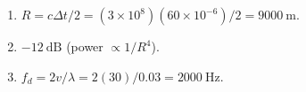 \begin{enumerate}[leftmargin=1.6em,itemsep=2pt]
\item $R = c\Delta t/2 = (3\times10^8)(60\times10^{-6})/2 = 9000\ \text{m}$.
\item $-12\ \text{dB}$ (power $\propto 1/R^4$).
\item $f_d = 2v/\lambda = 2(30)/0.03 = 2000\ \text{Hz}$.
\end{enumerate}
